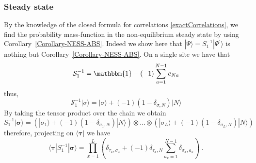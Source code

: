 \documentclass[10pt]{article}
\numberwithin{equation}{section}
\numberwithin{equation}{subsection}
\newcommand{\dt}{\;.}
\begin{document}
\subsubsection{Steady state}\label{appB}
By the knowledge of the closed formula for correlations \eqref{exactCorrelations}, we find the probability mass-function in the non-equilibrium steady state by using Corollary~\ref{Corollary-NESS-ABS}. Indeed we show here that 
$|\Psi\rangle=S_{1}^{-1}|\Psi^{'}\rangle$ is nothing but Corollary~\ref{Corollary-NESS-ABS}.
On a single site we have that 
\begin{equation}\label{S1-L1}
	\mathcal{S}_{1}^{-1}=\mathbbm{1}+(-1)\sum_{a=1}^{N-1}e_{Na}
\end{equation}
thus,
\begin{equation}
	\mathcal{S}_{1}^{-1}|\sigma\rangle=|\sigma\rangle+(-1)(1-\delta_{\sigma,N})|N\rangle
\end{equation}
By taking the tensor product over the chain we obtain 
\begin{equation}
	S_{1}^{-1}|\bm{\sigma}\rangle=\left(|\sigma_{1}\rangle+(-1)(1-\delta_{\sigma_{1},N})|N\rangle\right)\otimes \ldots \otimes \left(|\sigma_{L}\rangle+(-1)(1-\delta_{\sigma_{L},N})|N\rangle\right)
\end{equation}
therefore, projecting on $\langle \bm{\tau}|$ we have
\begin{equation}\label{Tensor-S1}
	\langle \bm{\tau}|	S_{1}^{-1}|\bm{\sigma}\rangle=\prod_{x=1}^{L}\left(\delta_{\tau_{x},\sigma_{x}}+(-1)\delta_{\tau_{x},N}\sum_{a_{x}=1}^{N-1}\delta_{\sigma_{x},a_{x}}\right)\dt
\end{equation}
\end{document}
